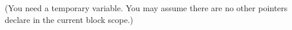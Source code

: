 (You need a temporary variable. You may assume there are no other
pointers declare in the current block scope.)
\\
\ANSWER
\begin{answercode}

\end{answercode}

